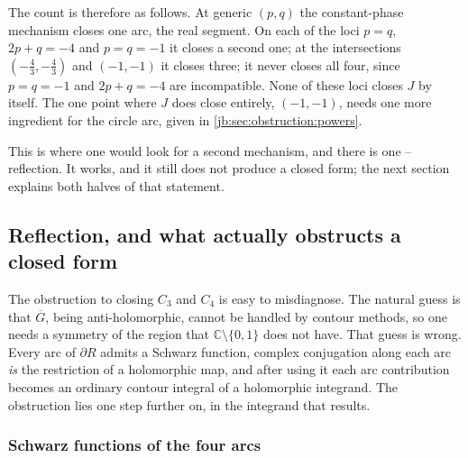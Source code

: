 The count is therefore as follows.
At generic $(p, q)$ the constant-phase mechanism closes one arc, the real segment.
On each of the loci $p = q$, $2 p + q = -4$ and $p = q = -1$ it closes a second one; at the
intersections $(-\tfrac43, -\tfrac43)$ and $(-1, -1)$ it closes three; it never closes all four,
since $p = q = -1$ and $2 p + q = -4$ are incompatible.
None of these loci closes $J$ by itself.
The one point where $J$ does close entirely, $(-1, -1)$, needs one more ingredient for the circle
arc, given in \cref{jb:sec:obstruction:powers}.

This is where one would look for a second mechanism, and there is one -- reflection.
It works, and it still does not produce a closed form; the next section explains both halves of that
statement.


\subsection{Reflection, and what actually obstructs a closed form}
\label{jb:sec:obstruction}


The obstruction to closing $C_3$ and $C_4$ is easy to misdiagnose.
The natural guess is that $\overline{G}$, being anti-holomorphic, cannot be handled by contour
methods, so one needs a symmetry of the region that $\mathbb{C} \setminus \{0, 1\}$ does not have.
That guess is wrong.
Every arc of $\partial R$ admits a Schwarz function, complex conjugation along each arc \emph{is}
the restriction of a holomorphic map, and after using it each arc contribution becomes an ordinary
contour integral of a holomorphic integrand.
The obstruction lies one step further on, in the integrand that results.


\subsubsection{Schwarz functions of the four arcs}
\label{jb:sec:obstruction:schwarz}

